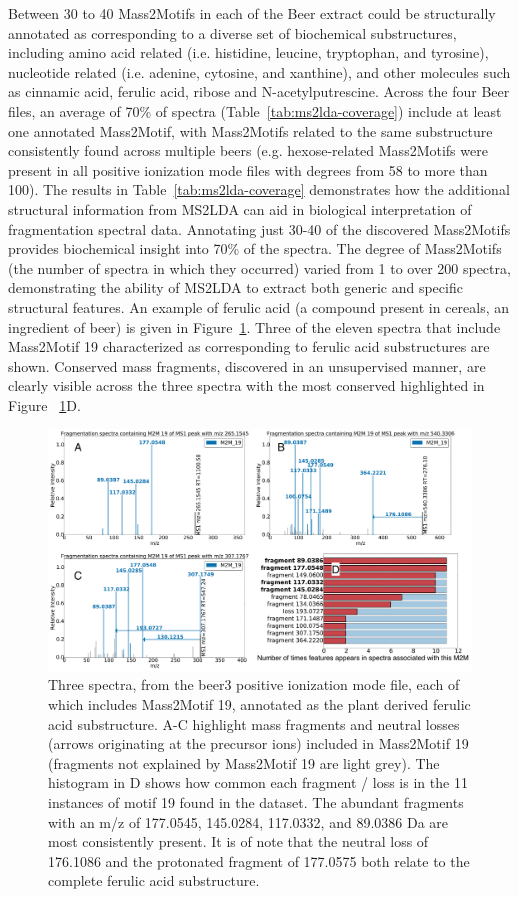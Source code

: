 Between 30 to 40 Mass2Motifs in each of the Beer extract could be structurally annotated as corresponding to a diverse set of biochemical substructures, including amino acid related (i.e. histidine, leucine, tryptophan, and tyrosine), nucleotide related (i.e. adenine, cytosine, and xanthine), and other molecules such as cinnamic acid, ferulic acid, ribose and N-acetylputrescine. Across the four Beer files, an average of 70\% of spectra (Table~\ref{tab:ms2lda-coverage}) include at least one annotated Mass2Motif, with Mass2Motifs related to the same substructure consistently found across multiple beers (e.g. hexose-related Mass2Motifs were present in all positive ionization mode files with degrees from 58 to more than 100). The results in Table~\ref{tab:ms2lda-coverage} demonstrates how the additional structural information from MS2LDA can aid in biological interpretation of fragmentation spectral data. Annotating just 30-40 of the discovered Mass2Motifs provides biochemical insight into 70\% of the spectra. The degree of Mass2Motifs (the number of spectra in which they occurred) varied from 1 to over 200 spectra, demonstrating the ability of MS2LDA to extract both generic and specific structural features. An example of ferulic acid (a compound present in cereals, an ingredient of beer) is given in Figure~\ref{fig:m2lda-ferulic-acid}. Three of the eleven spectra that include Mass2Motif 19 characterized as corresponding to ferulic acid substructures are shown. Conserved mass fragments, discovered in an unsupervised manner, are clearly visible across the three spectra with the most conserved highlighted in Figure ~\ref{fig:m2lda-ferulic-acid}D.   

\begin{figure}[!htbp]
\centering\includegraphics[width=0.8\linewidth]{07-lda/figures/ferulic_acid.pdf}
\centering\caption{Three spectra, from the beer3 positive ionization mode file, each of which includes Mass2Motif 19, annotated as the plant derived ferulic acid substructure. A-C highlight mass fragments and neutral losses (arrows originating at the precursor ions) included in Mass2Motif 19 (fragments not explained by Mass2Motif 19 are light grey). The histogram in D shows how common each fragment / loss is in the 11 instances of motif 19 found in the dataset. The abundant fragments with an m/z of 177.0545, 145.0284, 117.0332, and 89.0386 Da are most consistently present. It is of note that the neutral loss of 176.1086 and the protonated fragment of 177.0575 both relate to the complete ferulic acid substructure.\label{fig:m2lda-ferulic-acid}}
\end{figure}

